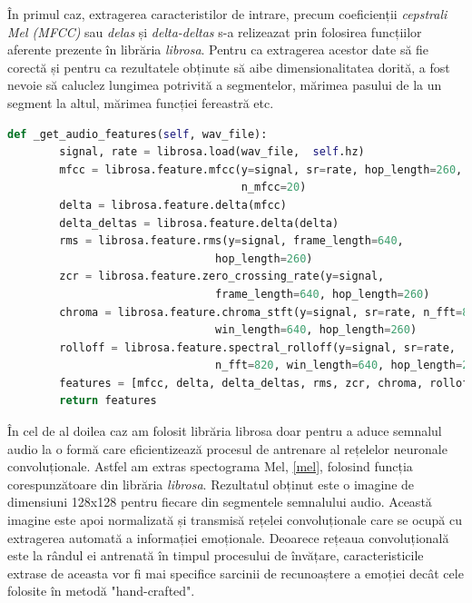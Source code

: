 \documentclass[a4paper,12pt]{book}
\begin{document}
				În primul caz, extragerea caracteristilor de intrare, precum coeficienții \textit{cepstrali Mel (MFCC)} sau \textit{delas} și \textit{delta-deltas} s-a relizeazat prin folosirea funcțiilor aferente prezente în librăria \textit{librosa}. Pentru ca extragerea acestor date să fie corectă și pentru ca rezultatele obținute să aibe dimensionalitatea dorită, a fost nevoie să caluclez lungimea potrivită a segmentelor, mărimea pasului de la un segment la altul, mărimea funcției fereastră etc. \par
				
				\begin{lstlisting}[language=Python, caption={Extragerea caracteristicilor hand-crafted, 3.3, folosind libraria librosa.}, xleftmargin=0cm]
 def _get_audio_features(self, wav_file):
		signal, rate = librosa.load(wav_file,  self.hz)
		mfcc = librosa.feature.mfcc(y=signal, sr=rate, hop_length=260, 
									n_mfcc=20)
		delta = librosa.feature.delta(mfcc)
		delta_deltas = librosa.feature.delta(delta)
		rms = librosa.feature.rms(y=signal, frame_length=640, 
								hop_length=260)
		zcr = librosa.feature.zero_crossing_rate(y=signal, 
								frame_length=640, hop_length=260)
		chroma = librosa.feature.chroma_stft(y=signal, sr=rate, n_fft=820, 
								win_length=640,	hop_length=260)
		rolloff = librosa.feature.spectral_rolloff(y=signal, sr=rate, 
								n_fft=820, win_length=640, hop_length=260)
		features = [mfcc, delta, delta_deltas, rms, zcr, chroma, rolloff]
		return features	\end{lstlisting}
				
				În cel de al doilea caz am folosit librăria librosa doar pentru a aduce semnalul audio la o formă care eficientizează procesul de antrenare al rețelelor neuronale convoluționale. Astfel am extras spectograma Mel, \ref{mel}, folosind funcția corespunzătoare din librăria \textit{librosa}. Rezultatul obținut este o imagine de dimensiuni 128x128 pentru fiecare din segmentele semnalului audio. Această imagine este apoi normalizată și transmisă rețelei convoluționale care se ocupă cu extragerea automată a informației emoționale. Deoarece rețeaua convoluțională este la rândul ei antrenată în timpul procesului de învățare, caracteristicile extrase de aceasta vor fi mai specifice sarcinii de recunoaștere a emoției decât cele folosite în metodă "hand-crafted". \par
				
\end{document}
